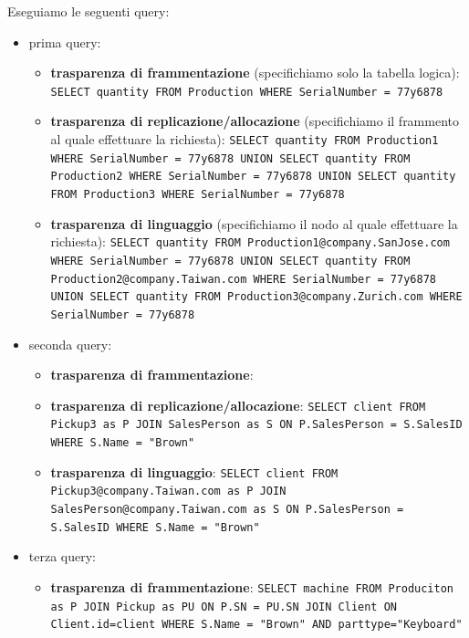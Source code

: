 \begin{esempio} 
      Eseguiamo le seguenti query:
      \begin{itemize}
            \item prima query:
            \begin{itemize}
                  \item \textbf{trasparenza di frammentazione} (specifichiamo solo la tabella logica): \texttt{SELECT quantity FROM Production WHERE SerialNumber = 77y6878}
                  \item \textbf{trasparenza di replicazione/allocazione} (specifichiamo il frammento al quale effettuare la richiesta): \texttt{SELECT quantity FROM Production1 WHERE SerialNumber = 77y6878 UNION SELECT quantity FROM Production2 WHERE SerialNumber = 77y6878 UNION SELECT quantity FROM Production3 WHERE SerialNumber = 77y6878  }
                  \item \textbf{trasparenza di linguaggio} (specifichiamo il nodo al quale effettuare la richiesta): \texttt{SELECT quantity FROM Production1@company.SanJose.com WHERE SerialNumber = 77y6878 UNION SELECT quantity FROM Production2@company.Taiwan.com WHERE SerialNumber = 77y6878 UNION SELECT quantity FROM Production3@company.Zurich.com WHERE SerialNumber = 77y6878  }
            \end{itemize}
            \item seconda query:
            \begin{itemize}
                  \item \textbf{trasparenza di frammentazione}: 
                  \item \textbf{trasparenza di replicazione/allocazione}: \texttt{SELECT client FROM Pickup3 as P JOIN SalesPerson as S ON P.SalesPerson = S.SalesID WHERE S.Name = "Brown"}
                  \item \textbf{trasparenza di linguaggio}: \texttt{SELECT client FROM Pickup3@company.Taiwan.com as P JOIN SalesPerson@company.Taiwan.com as S ON P.SalesPerson = S.SalesID WHERE S.Name = "Brown"}
            \end{itemize}
            \item terza query:
            \begin{itemize}
                  \item \textbf{trasparenza di frammentazione}:  \texttt{SELECT machine FROM Produciton as P JOIN Pickup as PU ON P.SN = PU.SN JOIN Client ON Client.id=client WHERE S.Name = "Brown" AND parttype="Keyboard"}

\end{itemize}
\end{itemize}
\end{esempio}
